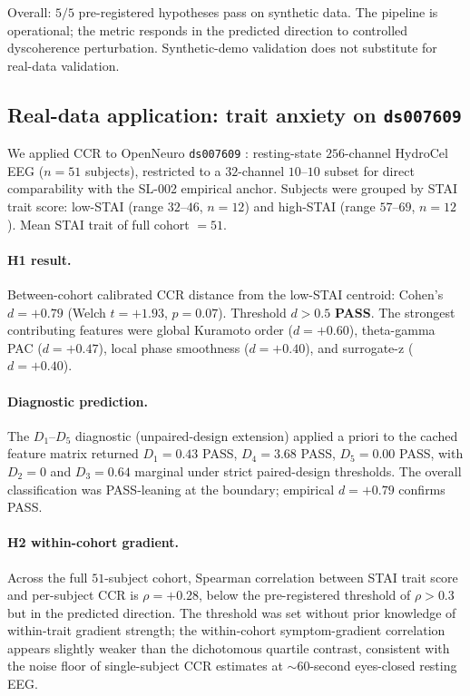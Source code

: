 \documentclass[11pt,a4paper]{article}
\begin{document}
Overall: $5/5$ pre-registered hypotheses pass on synthetic data. The pipeline is operational; the metric responds in the predicted direction to controlled dyscoherence perturbation. Synthetic-demo validation does not substitute for real-data validation.

\subsection{Real-data application: trait anxiety on \texttt{ds007609}}\label{sec:results-anxiety}

We applied CCR to OpenNeuro \texttt{ds007609} \citep{ShalamberidzeAnxiety2025}: resting-state $256$-channel HydroCel EEG ($n = 51$ subjects), restricted to a $32$-channel $10$--$10$ subset for direct comparability with the SL-002 empirical anchor. Subjects were grouped by STAI trait score: low-STAI (range $32$--$46$, $n = 12$) and high-STAI (range $57$--$69$, $n = 12$). Mean STAI trait of full cohort $= 51$.

\paragraph{H1 result.} Between-cohort calibrated CCR distance from the low-STAI centroid: Cohen's $d = +0.79$ (Welch $t = +1.93$, $p = 0.07$). Threshold $d > 0.5$ \textbf{PASS}. The strongest contributing features were global Kuramoto order ($d = +0.60$), theta-gamma PAC ($d = +0.47$), local phase smoothness ($d = +0.40$), and surrogate-z ($d = +0.40$).

\paragraph{Diagnostic prediction.} The $D_1$--$D_5$ diagnostic (unpaired-design extension) applied a priori to the cached feature matrix returned $D_1 = 0.43$ PASS, $D_4 = 3.68$ PASS, $D_5 = 0.00$ PASS, with $D_2 = 0$ and $D_3 = 0.64$ marginal under strict paired-design thresholds. The overall classification was PASS-leaning at the boundary; empirical $d = +0.79$ confirms PASS.

\paragraph{H2 within-cohort gradient.} Across the full $51$-subject cohort, Spearman correlation between STAI trait score and per-subject CCR is $\rho = +0.28$, below the pre-registered threshold of $\rho > 0.3$ but in the predicted direction. The threshold was set without prior knowledge of within-trait gradient strength; the within-cohort symptom-gradient correlation appears slightly weaker than the dichotomous quartile contrast, consistent with the noise floor of single-subject CCR estimates at $\sim 60$-second eyes-closed resting EEG.
\end{document}
